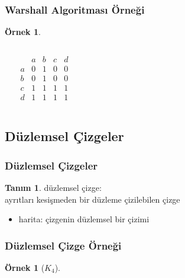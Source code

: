 \documentclass[dvipsnames]{beamer}
\theoremstyle{definition}
\newtheorem{tanim}[theorem]{Tanım}
\theoremstyle{example}
\newtheorem{ornek}[theorem]{Örnek}
\theoremstyle{plain}
\begin{document}
\begin{frame}
  \frametitle{Warshall Algoritması Örneği}

  \begin{ornek}
    \begin{columns}
      \begin{center}
      \end{center}

      \[
        \begin{array}{c|cccc}
              & a & b & c & d\\\hline
            a & 0 & 1 & 0 & 0\\
            b & 0 & 1 & 0 & 0\\
            c & 1 & 1 & 1 & 1\\
            d & 1 & 1 & 1 & 1
        \end{array}
      \]
    \end{columns}
  \end{ornek}
\end{frame}

\subsection{Düzlemsel Çizgeler}

\begin{frame}
  \frametitle{Düzlemsel Çizgeler}

  \begin{tanim}
    \alert{düzlemsel çizge}:\\
    ayrıtları kesişmeden bir düzleme çizilebilen çizge

    \begin{itemize}
      \item \alert{harita}: çizgenin düzlemsel bir çizimi
    \end{itemize}
  \end{tanim}
\end{frame}

\begin{frame}
  \frametitle{Düzlemsel Çizge Örneği}

  \begin{ornek}[$K_4$]
    \begin{columns}
      \begin{center}
      \end{center}

      \begin{center}
      \end{center}
    \end{columns}
  \end{ornek}
\end{frame}
\end{document}
